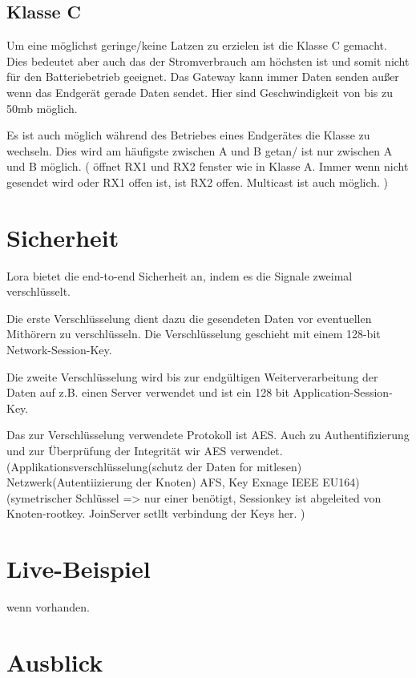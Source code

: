 \documentclass[a4paper,12pt]{article}
\begin{document}
        \subsection{Klasse C}
            Um eine möglichst geringe/keine Latzen zu erzielen ist die Klasse C gemacht. Dies bedeutet aber auch das der Stromverbrauch am höchsten ist und somit nicht für den Batteriebetrieb geeignet.
            Das Gateway kann immer Daten senden außer wenn das Endgerät gerade Daten sendet. Hier sind Geschwindigkeit von bis zu 50mb möglich.

            Es ist auch möglich während des Betriebes eines Endgerätes die Klasse zu wechseln. Dies wird am häufigste zwischen A und B getan/ ist nur zwischen A und B möglich.
            \cite{LoRaSpec}(
                öffnet RX1 und RX2 fenster wie in Klasse A. Immer wenn  nicht gesendet wird oder RX1 offen ist, ist RX2 offen. Multicast ist auch möglich.
            )
    \section{Sicherheit} \label{sec:Sicherheit}
        Lora bietet die end-to-end Sicherheit an, indem es die Signale zweimal verschlüsselt.

        Die erste Verschlüsselung dient dazu die gesendeten Daten vor eventuellen Mithörern zu verschlüsseln. Die Verschlüsselung geschieht mit einem 128-bit Network-Session-Key.

        Die zweite Verschlüsselung wird bis zur endgültigen Weiterverarbeitung der Daten auf z.B. einen Server verwendet und ist ein 128 bit Application-Session-Key.

        Das zur Verschlüsselung verwendete Protokoll ist AES. Auch zu Authentifizierung und zur Überprüfung der Integrität wir AES verwendet.
        \cite{LoRaSecur}
            \cite{WhatIsLoRa}(Applikationsverschlüsselung(schutz der Daten for mitlesen) Netzwerk(Autentiizierung der Knoten) AFS, Key Exnage IEEE EU164)
            \cite{LoRaSpec}(symetrischer Schlüssel => nur einer benötigt, Sessionkey ist abgeleited von Knoten-rootkey. JoinServer setllt verbindung der Keys her.
            )
    \section{Live-Beispiel}
        wenn vorhanden.

    \section{Ausblick}
        \newpage
    
    
\end{document}
